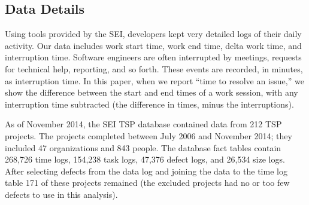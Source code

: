 \subsection{Data Details}
\label{sec:data-collection}


Using tools provided by the SEI, developers kept very detailed logs of their daily activity. Our data includes  work start time, work end time,  delta
work time, and interruption time. Software engineers are often
interrupted by meetings, requests for technical help, reporting, and
so forth. These events are recorded, in minutes, as interruption
time.  
In this paper, when we report ``time to resolve an
issue,'' we show the difference between the start and end times
of a work session, with any interruption time subtracted (the
difference in times, minus the interruptions). 

As of November 2014, the SEI TSP database contained data from 212
TSP projects. The projects completed between July 2006 and
November 2014; they included 47 organizations and 843 people. 
The database fact tables
contain 268,726 time logs, 
154,238 task logs,
 47,376 defect logs, 
and 26,534 size logs. 
After selecting defects from the data log and joining the data to the time log table  171 of these projects remained (the excluded projects had no or too few defects to use in this analysis).

